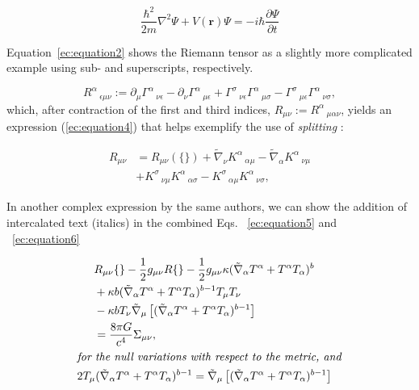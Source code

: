 \documentclass[9pt,twoside]{rmaa-rho-class/rmaa-rho}
\begin{document}
    \begin{equation} \label{ec:equation2}
         \frac{\hbar^2}{2m}\nabla^2\Psi + V(\mathbf{r})\Psi = -i\hbar \frac{\partial\Psi}{\partial t}
    \end{equation} 

    Equation~\ref{ec:equation2} shows the Riemann tensor as a slightly more complicated example using sub- and superscripts, respectively.

    \begin{equation} \label{ec:equation3}
        R^\alpha\,_{\epsilon\mu\nu}:=\partial_\mu\Gamma^\alpha\,_{\nu\epsilon}
	-\partial_\nu\Gamma^\alpha\,_{\mu\epsilon}
	+\Gamma^\sigma\,_{\nu\epsilon} \Gamma^\alpha\,_{\mu\sigma}
	-\Gamma^\sigma\,_{\mu\epsilon} \Gamma^\alpha\,_{\nu\sigma},
    \end{equation}
    which, after contraction of the first and third indices, $R_{\mu\nu}:=R^\alpha\,_{\mu\alpha\nu}$, yields an expression (\ref{ec:equation4}) that helps exemplify the use of \textit{splitting} \citep{BarMen17}:

    \begin{equation} \label{ec:equation4}
	\begin{split}
    	R_{\mu\nu}&=R_{\mu\nu}(\{\})
    	+\tilde{\nabla}_\nu K^\alpha\,_{\alpha\mu}
    	-\tilde{\nabla}_\alpha K^\alpha\,_{\nu\mu}\\
    	&+K^\sigma\,_{\nu\mu} K^\alpha\,_{\alpha\sigma}
    	-K^\sigma\,_{\alpha\mu} K^\alpha\,_{\nu\sigma},
	\end{split}
    \end{equation}

    In another complex expression by the same authors, we can show the addition of intercalated text (italics) in the combined Eqs. ~\ref{ec:equation5} and ~\ref{ec:equation6}

    \begin{gather}
	\begin{split}
		&R_{\mu\nu}\{\}-\frac{1}{2}g_{\mu\nu}R\{\}
			-\frac{1}{2}g_{\mu\nu}\kappa(\tilde{\nabla}_\alpha
			T^\alpha+ T^\alpha T_\alpha)^b\\
		&+\kappa b(\tilde{\nabla}_\alpha T^\alpha+T^\alpha
			T_\alpha)^{b-1}T_\mu T_\nu \\ 
	        & -\kappa bT_\nu \tilde{\nabla}_\mu\left[(\tilde{\nabla}_\alpha
			T^\alpha+ T^\alpha T_\alpha)^{b-1}\right]\\
		&=\frac{8\pi G}{c^4} \Sigma_{\mu\nu},
	\end{split}
	\label{ec:equation5}
	\\
	\intertext{\textit{for the null variations with respect to the metric, and}}
	2T_\mu(\tilde{\nabla}_\alpha T^\alpha+ T^\alpha T_\alpha)^{b-1}=
		\tilde{\nabla}_\mu\left[(\tilde{\nabla}_\alpha T^\alpha+ T^\alpha T_\alpha)^{b-1}\right]
	\label{ec:equation6}
    \end{gather}
\end{document}
